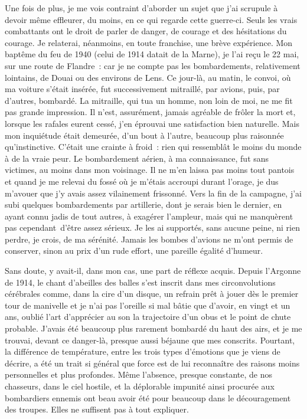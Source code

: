 \documentclass[french,twoside]{book} %
\begin{document}
Une fois de plus, je me vois contraint d’aborder un sujet que j’ai scrupule à devoir même effleurer, du moins, en ce qui regarde cette guerre-ci. Seuls les vrais combattants ont le droit de parler de danger, de courage et des hésitations du courage. Je relaterai, néanmoins, en toute franchise, une brève expérience. Mon baptême du feu de 1940 (celui de 1914 datait de la Marne), je l’ai reçu le 22 mai, sur une route de Flandre : car je ne compte pas les bombardements, relativement lointains, de Douai ou des environs de Lens. Ce jour-là, au matin, le convoi, où ma voiture s’était insérée, fut successivement mitraillé, par avions, puis, par d’autres, bombardé. La mitraille, qui tua un homme, non loin de moi, ne me fit pas grande impression. Il n’est, assurément, jamais agréable de frôler la mort et, lorsque les rafales eurent cessé, j’en éprouvai une satisfaction bien naturelle. Mais mon inquiétude était demeurée, d’un bout à l’autre, beaucoup plus raisonnée qu’instinctive. C’était une crainte à froid : rien qui ressemblât le moins du monde à de la vraie peur. Le bombardement aérien, à ma connaissance, fut sans victimes, au moins dans mon voisinage. Il ne m’en laissa pas moins tout pantois et quand je me relevai du fossé où je m’étais accroupi durant l’orage, je dus m’avouer que j’y avais assez vilainement frissonné. Vers la fin de la campagne, j’ai subi quelques bombardements par artillerie, dont je serais bien le dernier, en ayant connu jadis de tout autres, à exagérer l’ampleur, mais qui ne manquèrent pas   cependant d’être assez sérieux. Je les ai supportés, sans aucune peine, ni rien perdre, je crois, de ma sérénité. Jamais les bombes d’avions ne m’ont permis de conserver, sinon au prix d’un rude effort, une pareille égalité d’humeur.\par
Sans doute, y avait-il, dans mon cas, une part de réflexe acquis. Depuis l’Argonne de 1914, le chant d’abeilles des balles s’est inscrit dans mes circonvolutions cérébrales comme, dans la cire d’un disque, un refrain prêt à jouer dès le premier tour de manivelle et je n’ai pas l’oreille si mal bâtie que d’avoir, en vingt et un ans, oublié l’art d’apprécier au son la trajectoire d’un obus et le point de chute probable. J’avais été beaucoup plus rarement bombardé du haut des airs, et je me trouvai, devant ce danger-là, presque aussi béjaune que mes conscrits. Pourtant, la différence de température, entre les trois types d’émotions que je viens de décrire, a été un trait si général que force est de lui reconnaître des raisons moins personnelles et plus profondes. Même l’absence, presque constante, de nos chasseurs, dans le ciel hostile, et la déplorable impunité ainsi procurée aux bombardiers ennemis ont beau avoir été pour beaucoup dans le découragement des troupes. Elles ne suffisent pas à tout expliquer.\par
\end{document}
